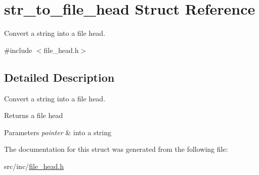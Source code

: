 \hypertarget{structstr__to__file__head}{}\section{str\+\_\+to\+\_\+file\+\_\+head Struct Reference}
\label{structstr__to__file__head}


Convert a string into a file head.  




{\ttfamily \#include $<$file\+\_\+head.\+h$>$}



\subsection{Detailed Description}
Convert a string into a file head. 

\begin{DoxyReturn}{Returns}
a file head 
\end{DoxyReturn}

\begin{DoxyParams}{Parameters}
{\em pointer} & into a string \\
\hline
\end{DoxyParams}


The documentation for this struct was generated from the following file\+:\begin{DoxyCompactItemize}
\item 
src/inc/\mbox{\hyperlink{file__head_8h}{file\+\_\+head.\+h}}\end{DoxyCompactItemize}
